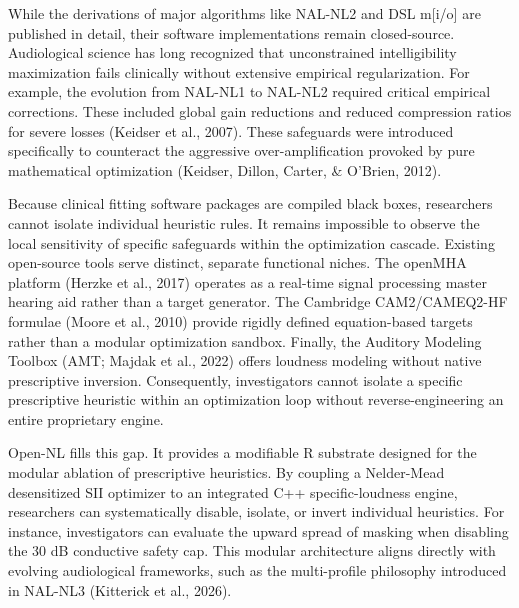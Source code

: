 \documentclass[
  12pt,
]{article}
\begin{document}
While the derivations of major algorithms like NAL-NL2 and DSL
m{[}i/o{]} are published in detail, their software implementations
remain closed-source. Audiological science has long recognized that
unconstrained intelligibility maximization fails clinically without
extensive empirical regularization. For example, the evolution from
NAL-NL1 to NAL-NL2 required critical empirical corrections. These
included global gain reductions and reduced compression ratios for
severe losses (Keidser et al., 2007). These safeguards were introduced
specifically to counteract the aggressive over-amplification provoked by
pure mathematical optimization (Keidser, Dillon, Carter, \& O'Brien,
2012).

Because clinical fitting software packages are compiled black boxes,
researchers cannot isolate individual heuristic rules. It remains
impossible to observe the local sensitivity of specific safeguards
within the optimization cascade. Existing open-source tools serve
distinct, separate functional niches. The openMHA platform (Herzke et
al., 2017) operates as a real-time signal processing master hearing aid
rather than a target generator. The Cambridge CAM2/CAMEQ2-HF formulae
(Moore et al., 2010) provide rigidly defined equation-based targets
rather than a modular optimization sandbox. Finally, the Auditory
Modeling Toolbox (AMT; Majdak et al., 2022) offers loudness modeling
without native prescriptive inversion. Consequently, investigators
cannot isolate a specific prescriptive heuristic within an optimization
loop without reverse-engineering an entire proprietary engine.

Open-NL fills this gap. It provides a modifiable R substrate designed
for the modular ablation of prescriptive heuristics. By coupling a
Nelder-Mead desensitized SII optimizer to an integrated C++
specific-loudness engine, researchers can systematically disable,
isolate, or invert individual heuristics. For instance, investigators
can evaluate the upward spread of masking when disabling the 30 dB
conductive safety cap. This modular architecture aligns directly with
evolving audiological frameworks, such as the multi-profile philosophy
introduced in NAL-NL3 (Kitterick et al., 2026).
\end{document}
